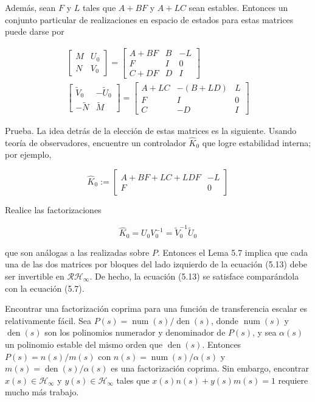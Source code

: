 Además, sean $F$ y $L$ tales que $A+B F$ y $A+L C$ sean estables. Entonces un conjunto particular de realizaciones en espacio de estados para estas matrices puede darse por


\begin{gather*}
{\left[\begin{array}{cc}
M & U_{0} \\
N & V_{0}
\end{array}\right]=\left[\begin{array}{c|cc}
A+B F & B & -L \\
\hline F & I & 0 \\
C+D F & D & I
\end{array}\right]}  \tag{5.14}\\
{\left[\begin{array}{cc}
\tilde{V}_{0} & -\tilde{U}_{0} \\
-\tilde{N} & \tilde{M}
\end{array}\right]=\left[\begin{array}{c|cc}
A+L C & -(B+L D) & L \\
\hline F & I & 0 \\
C & -D & I
\end{array}\right]} \tag{5.15}
\end{gather*}


Prueba. La idea detrás de la elección de estas matrices es la siguiente. Usando teoría de observadores, encuentre un controlador $\hat{K}_{0}$ que logre estabilidad interna; por ejemplo,

\[
\hat{K}_{0}:=\left[\begin{array}{c|c}
A+B F+L C+L D F & -L  \tag{5.16}\\
\hline F & 0
\end{array}\right]
\]

Realice las factorizaciones

$$
\hat{K}_{0}=U_{0} V_{0}^{-1}=\tilde{V}_{0}^{-1} \tilde{U}_{0}
$$

que son análogas a las realizadas sobre $P$. Entonces el Lema 5.7 implica que cada una de las dos matrices por bloques del lado izquierdo de la ecuación (5.13) debe ser invertible en $\mathcal{R H}_{\infty}$. De hecho, la ecuación (5.13) se satisface comparándola con la ecuación (5.7).

Encontrar una factorización coprima para una función de transferencia escalar es relativamente fácil. Sea $P(s)=\operatorname{num}(s) / \operatorname{den}(s)$, donde $\operatorname{num}(s)$ y $\operatorname{den}(s)$ son los polinomios numerador y denominador de $P(s)$, y sea $\alpha(s)$ un polinomio estable del mismo orden que $\operatorname{den}(s)$. Entonces $P(s)=n(s) / m(s)$ con $n(s)=\operatorname{num}(s) / \alpha(s)$ y $m(s)=\operatorname{den}(s) / \alpha(s)$ es una factorización coprima. Sin embargo, encontrar $x(s) \in \mathcal{H}_{\infty}$ y $y(s) \in \mathcal{H}_{\infty}$ tales que $x(s) n(s)+y(s) m(s)=1$ requiere mucho más trabajo.

